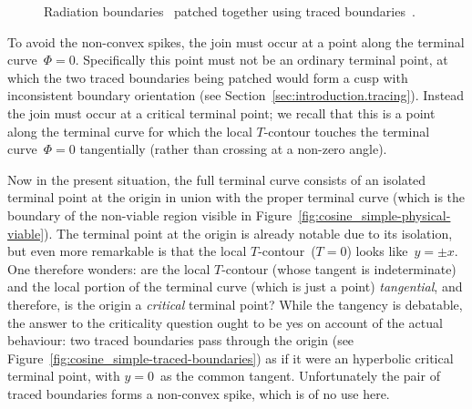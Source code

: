 \begin{figure}
  \newcommand*{\subfigurewidth}{0.36\textwidth}
  \centering
  \hspace*{\fill}
  \begin{subfigure}[t]{\subfigurewidth}
  \end{subfigure}
    \hfill
  \begin{subfigure}[t]{\subfigurewidth}
  \end{subfigure}
  \hspace*{\fill}
  \caption{
    Radiation boundaries~ patched together
    using traced boundaries~.
  }
  \label{fig:cosine_simple-traced-boundaries-patched}
\end{figure}

\begin{figure}
\end{figure}

To avoid the non-convex spikes,
the join must occur at a point along the terminal curve~$\Phi = 0$.
Specifically this point must not be an ordinary terminal point,
at which the two traced boundaries being patched
would form a cusp with inconsistent boundary orientation
(see Section~\ref{sec:introduction.tracing}).
Instead the join must occur at a critical terminal point;
we recall that this is a point along the terminal curve
for which the local $T$-contour touches the terminal curve~$\Phi = 0$
tangentially (rather than crossing at a non-zero angle).

Now in the present situation,
the full terminal curve consists of
an isolated terminal point at the origin
in union with the proper terminal curve
(which is the boundary of the non-viable region
visible in Figure~\ref{fig:cosine_simple-physical-viable}).
The terminal point at the origin is already notable due to its isolation,
but even more remarkable is that the local $T$-contour~($T = 0$)
looks like~$y = \pm x$.
One therefore wonders:
  are the local $T$-contour (whose tangent is indeterminate)
  and the local portion of the terminal curve (which is just a point)
  \emph{tangential}, and therefore,
  is the origin a \emph{critical} terminal point?
While the tangency is debatable,
the answer to the criticality question ought to be yes
on account of the actual behaviour:
two traced boundaries pass through the origin
(see Figure~\ref{fig:cosine_simple-traced-boundaries})
as if it were an hyperbolic critical terminal point,
with $y = 0$~as the common tangent.
Unfortunately the pair of traced boundaries forms a non-convex spike,
which is of no use here.

